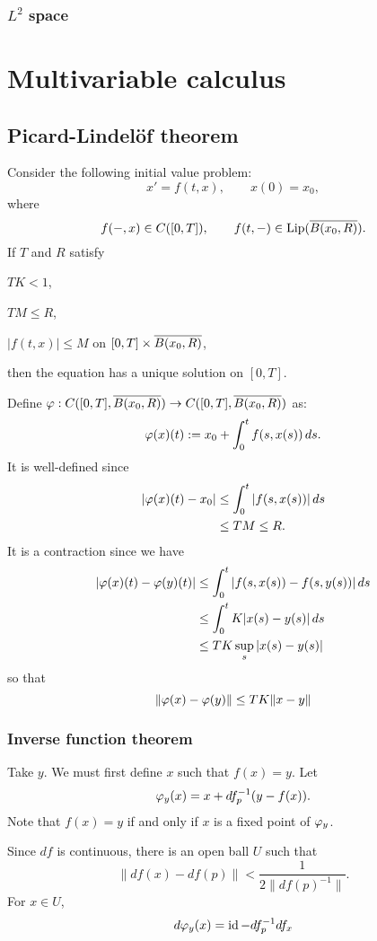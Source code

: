 \documentclass{../crs}
\begin{document}
\subsection{$L^2$ space}








\chapter{Multivariable calculus}

\section{Picard-Lindel\"of theorem}
\begin{thm}
Consider the following initial value problem:
\[x'=f(t,x),\qquad x(0)=x_0,\]
where
\[f(-,x)\in C([0,T]),\qquad f(t,-)\in\operatorname{Lip}(\overline{B(x_0,R)}).\]
If $T$ and $R$ satisfy
\begin{cond}
\item $TK<1$,
\item $TM\le R$,
\item $|f(t,x)|\le M$ on $[0,T]\times\overline{B(x_0,R)}$,
\end{cond}
then the equation has a unique solution on $[0,T]$.
\end{thm}
\begin{pf}
Define $\f:C([0,T],\cl{B(x_0,R)})\to C([0,T],\cl{B(x_0,R)})$ as:
\[\varphi(x)(t):=x_0+\int_0^tf(s,x(s))\,ds.\]
It is well-defined since
\begin{align*}
|\varphi(x)(t)-x_0|&\le\int_0^t|f(s,x(s))|\,ds\\
&\le TM\le R.
\end{align*}
It is a contraction since we have
\begin{align*}
|\varphi(x)(t)-\varphi(y)(t)|
&\le\int_0^t|f(s,x(s))-f(s,y(s))|\,ds\\
&\le\int_0^tK|x(s)-y(s)|\,ds\\
&\le TK\sup_s|x(s)-y(s)|
\end{align*}
so that
\[\|\varphi(x)-\varphi(y)\|\le TK\|x-y\|\]
\end{pf}


\subsection{Inverse function theorem}

\begin{pf}[1]
Take $y$.
We must first define $x$ such that $f(x)=y$.
Let
\[\varphi_y(x)=x+df_p^{-1}(y-f(x)).\]
Note that $f(x)=y$ if and only if $x$ is a fixed point of $\varphi_y$.

Since $df$ is continuous, there is an open ball $U$ such that
\[\|df(x)-df(p)\|<\frac1{2\|df(p)^{-1}\|}.\]
For $x\in U$,
\[d\varphi_y(x)=\operatorname{id}-df_p^{-1}df_x\]
\end{pf}
\end{document}
